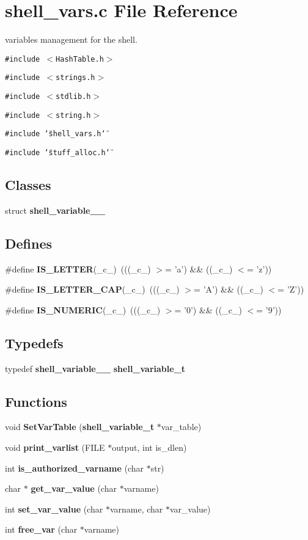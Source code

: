 \section{shell\_\-vars.c File Reference}
\label{shell__vars_8c}
variables management for the shell. 

{\tt \#include $<$Hash\-Table.h$>$}\par
{\tt \#include $<$strings.h$>$}\par
{\tt \#include $<$stdlib.h$>$}\par
{\tt \#include $<$string.h$>$}\par
{\tt \#include \char`\"{}shell\_\-vars.h\char`\"{}}\par
{\tt \#include \char`\"{}stuff\_\-alloc.h\char`\"{}}\par
\subsection*{Classes}
\begin{CompactItemize}
\item 
struct {\bf shell\_\-variable\_\-\_\-}
\end{CompactItemize}
\subsection*{Defines}
\begin{CompactItemize}
\item 
\#define {\bf IS\_\-LETTER}(\_\-c\_\-)\ (((\_\-c\_\-) $>$= 'a') \&\& ((\_\-c\_\-) $<$= 'z'))
\item 
\#define {\bf IS\_\-LETTER\_\-CAP}(\_\-c\_\-)\ (((\_\-c\_\-) $>$= 'A') \&\& ((\_\-c\_\-) $<$= 'Z'))
\item 
\#define {\bf IS\_\-NUMERIC}(\_\-c\_\-)\ (((\_\-c\_\-) $>$= '0') \&\& ((\_\-c\_\-) $<$= '9'))
\end{CompactItemize}
\subsection*{Typedefs}
\begin{CompactItemize}
\item 
typedef {\bf shell\_\-variable\_\-\_\-} {\bf shell\_\-variable\_\-t}
\end{CompactItemize}
\subsection*{Functions}
\begin{CompactItemize}
\item 
void {\bf Set\-Var\-Table} ({\bf shell\_\-variable\_\-t} $\ast$var\_\-table)
\item 
void {\bf print\_\-varlist} (FILE $\ast$output, int is\_\-dlen)
\item 
int {\bf is\_\-authorized\_\-varname} (char $\ast$str)
\item 
char $\ast$ {\bf get\_\-var\_\-value} (char $\ast$varname)
\item 
int {\bf set\_\-var\_\-value} (char $\ast$varname, char $\ast$var\_\-value)
\item 
int {\bf free\_\-var} (char $\ast$varname)
\end{CompactItemize}


